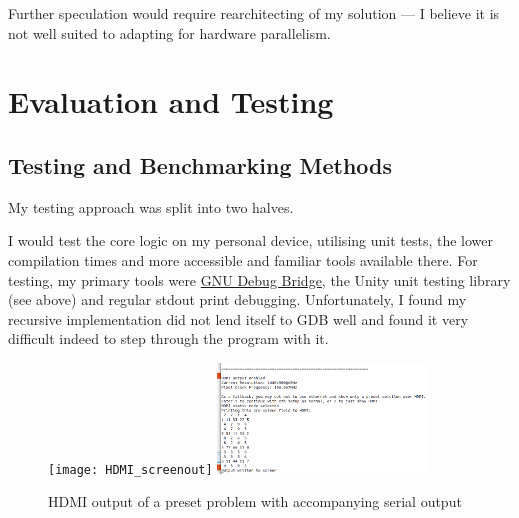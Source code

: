 \documentclass[11pt]{article}
\begin{document}
Further speculation would require rearchitecting of my solution --- I believe it is not well suited to adapting for hardware parallelism.

\newpage
\section{Evaluation and Testing}

\subsection{Testing and Benchmarking Methods}\label{sec:testing_benchmarking}


My testing approach was split into two halves.

I would test the core logic on my personal device, utilising unit tests, the lower compilation times and more accessible and familiar tools available there.
For testing, my primary tools were \href{https://www.gnu.org/software/gdb/}{GNU Debug Bridge}, the Unity unit testing library (see above) and regular stdout print debugging.
Unfortunately, I found my recursive implementation did not lend itself to GDB well and found it very difficult indeed to step through the program with it.

\begin{figure}[h]
  \centering
  \texttt{[image: HDMI\_screenout]}
  \includegraphics[width=0.5\textwidth]{HDMI_serialout}
  \caption{HDMI output of a preset problem with accompanying serial output}
  \label{fig:hdmi_debug}
\end{figure}
\end{document}
